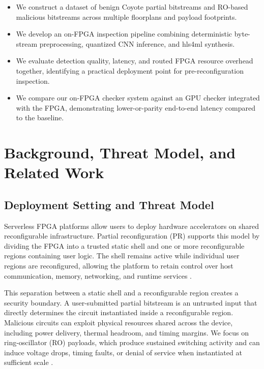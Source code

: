 \documentclass[acmsmall]{acmart}
\begin{document}
\begin{itemize}
    \item We construct a dataset of benign Coyote partial bitstreams and
    RO-based malicious bitstreams across multiple floorplans and payload
    footprints.

    \item We develop an on-FPGA inspection pipeline combining deterministic
    byte-stream preprocessing, quantized CNN inference, and hls4ml synthesis.

    \item We evaluate detection quality, latency, and routed FPGA resource
    overhead together, identifying a practical deployment point for
    pre-reconfiguration inspection.

    \item We compare our on-FPGA checker system against an GPU checker integrated with the FPGA, demonstrating
    lower-or-parity end-to-end latency compared to the baseline.
\end{itemize}

\section{Background, Threat Model, and Related Work}
\label{sec:background}

\subsection{Deployment Setting and Threat Model}
\label{sec:threat-model}

Serverless FPGA platforms allow users to deploy hardware accelerators on shared
reconfigurable infrastructure. Partial reconfiguration (PR) supports this model
by dividing the FPGA into a trusted static shell and one or more reconfigurable
regions containing user logic. The shell remains active while individual user
regions are reconfigured, allowing the platform to retain control over host
communication, memory, networking, and runtime services
\cite{korolija2020os,ramhorst2025coyote}.

This separation between a static shell and a reconfigurable region creates a security boundary. 
A user-submitted partial bitstream is an untrusted input that directly determines the circuit instantiated inside a
reconfigurable region. Malicious circuits can exploit physical resources shared
across the device, including power delivery, thermal headroom, and timing
margins. We focus on ring-oscillator (RO) payloads, which produce sustained
switching activity and can induce voltage drops, timing faults, or denial of
service when instantiated at sufficient scale
\cite{gnad2017voltage,la2021denial,provelengios2020power,boutros2020neighbors}.
\end{document}
